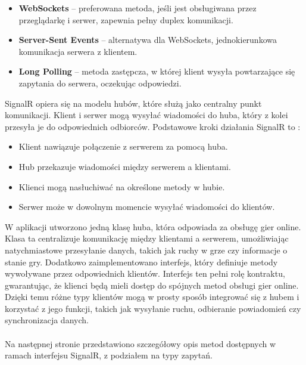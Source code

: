 \documentclass[twoside]{projektInzynierskiMS1}
\begin{document}
\begin{itemize}
    \item \textbf{WebSockets} – preferowana metoda, jeśli jest obsługiwana przez przeglądarkę i serwer, zapewnia pełny duplex komunikacji.
    \item \textbf{Server-Sent Events} – alternatywa dla WebSockets, jednokierunkowa komunikacja serwera z klientem.
    \item \textbf{Long Polling} – metoda zastępcza, w której klient wysyła powtarzające się zapytania do serwera, oczekując odpowiedzi.
\end{itemize}

\noindent
SignalR opiera się na modelu hubów, które służą jako centralny punkt komunikacji. Klient i serwer mogą wysyłać wiadomości do huba, który z kolei przesyła je do odpowiednich odbiorców. Podstawowe kroki działania SignalR to \cite{SignalRIntro}:

\begin{itemize}
    \item Klient nawiązuje połączenie z serwerem za pomocą huba.
    \item Hub przekazuje wiadomości między serwerem a klientami.
    \item Klienci mogą nasłuchiwać na określone metody w hubie.
    \item Serwer może w dowolnym momencie wysyłać wiadomości do klientów.
\end{itemize}

\noindent
W aplikacji utworzono jedną klasę huba, która odpowiada za obsługę gier online. Klasa ta centralizuje komunikację między klientami a serwerem, umożliwiając natychmiastowe przesyłanie danych, takich jak ruchy w grze czy informacje o stanie gry. Dodatkowo zaimplementowano interfejs, który definiuje metody wywoływane przez odpowiednich klientów. Interfejs ten pełni rolę kontraktu, gwarantując, że klienci będą mieli dostęp do spójnych metod obsługi gier online. Dzięki temu różne typy klientów mogą w prosty sposób integrować się z hubem i korzystać z jego funkcji, takich jak wysyłanie ruchu, odbieranie powiadomień czy synchronizacja danych.
\\\\
Na następnej stronie przedstawiono szczegółowy opis metod dostępnych w ramach interfejsu SignalR, z podziałem na typy zapytań.

\newpage
\end{document}
